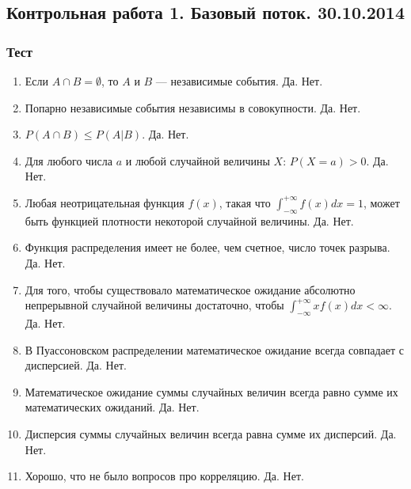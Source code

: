 \documentclass[12pt, a4paper]{article}\usepackage[]{graphicx}\usepackage[]{color}
\begin{document}
				\subsection{Контрольная работа 1. Базовый поток. 30.10.2014}
				\subsubsection*{Тест}

				\begin{enumerate}

					\item Если $A \cap B = \emptyset$, то $A$ и $B$ — независимые события. Да. Нет.

					\item Попарно независимые события независимы в совокупности. Да. Нет.

					\item $P(A \cap B) \le P(A|B)$. Да. Нет.

					\item Для любого числа $a$ и любой случайной величины $X$: $P(X=a)>0$. Да. Нет.

					\item Любая неотрицательная функция $f(x)$, такая что $\int_{-\infty}^{+\infty} f(x) dx = 1$, может быть функцией плотности некоторой случайной величины. Да. Нет.

					\item Функция распределения имеет не более, чем счетное, число точек разрыва. Да. Нет.

					\item Для того, чтобы существовало математическое ожидание абсолютно непрерывной случайной величины достаточно, чтобы $\int_{-\infty}^{+\infty} x f(x) dx < \infty$. Да. Нет.

					\item В Пуассоновском распределении математическое ожидание всегда совпадает с дисперсией.	Да. Нет.

					\item Математическое ожидание суммы случайных величин всегда равно сумме их математических ожиданий.	Да. Нет.

					\item Дисперсия суммы случайных величин всегда равна сумме их дисперсий.	Да. Нет.

					\item Хорошо, что не было вопросов про корреляцию.	Да. Нет.

				\end{enumerate}
\end{document}
